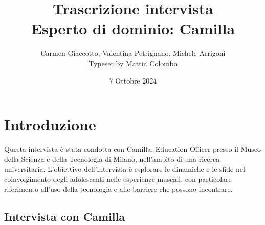 \documentclass{article}
\title{\textbf{Trascrizione intervista}\\ Esperto di dominio: Camilla}
\author{Carmen Giaccotto, Valentina Petrignano, Michele Arrigoni  \\ Typeset by Mattia Colombo}
\date{7 Ottobre 2024}
\begin{document}
\maketitle

\section{Introduzione}
Questa intervista è stata condotta con Camilla, Education Officer presso il Museo della Scienza e della Tecnologia di Milano, nell'ambito di una ricerca universitaria. L'obiettivo dell'intervista è esplorare le dinamiche e le sfide nel coinvolgimento degli adolescenti nelle esperienze museali, con particolare riferimento all'uso della tecnologia e alle barriere che possono incontrare.

\subsection{\textcolor{subsectioncolor}{Intervista con Camilla}}
\end{document}
